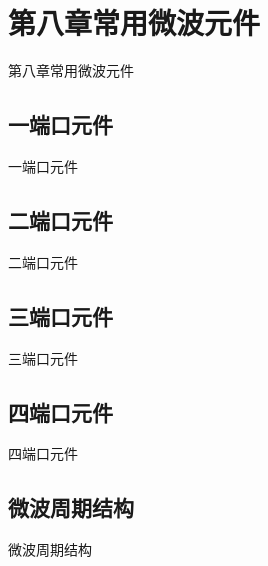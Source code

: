 \section{第八章\quad 常用微波元件}
\begin{frame}{第八章\quad 常用微波元件}

\end{frame}

\subsection{一端口元件}
\begin{frame}{一端口元件}

\end{frame}

\subsection{二端口元件}
\begin{frame}{二端口元件}

\end{frame}

\subsection{三端口元件}
\begin{frame}{三端口元件}

\end{frame}

\subsection{四端口元件}
\begin{frame}{四端口元件}

\end{frame}

\subsection{微波周期结构}
\begin{frame}{微波周期结构}

\end{frame}
